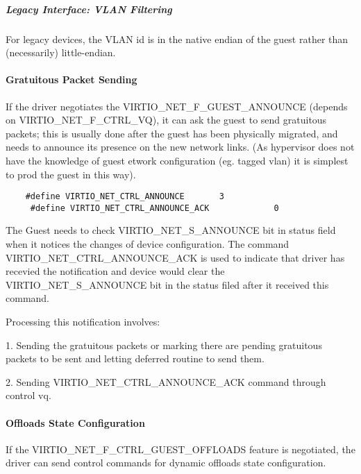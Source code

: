 \subparagraph{Legacy Interface: VLAN Filtering}\label{sec:Device Types / Network Device / Device Operation / Control Virtqueue / VLAN Filtering / Legacy Interface: VLAN Filtering}
For legacy devices, the VLAN id is in the
native endian of the guest rather than (necessarily) little-endian.

\paragraph{Gratuitous Packet Sending}\label{sec:Device Types / Network Device / Device Operation / Control Virtqueue / Gratuitous Packet Sending}

If the driver negotiates the VIRTIO_NET_F_GUEST_ANNOUNCE (depends
on VIRTIO_NET_F_CTRL_VQ), it can ask the guest to send gratuitous
packets; this is usually done after the guest has been physically
migrated, and needs to announce its presence on the new network
links. (As hypervisor does not have the knowledge of guest
etwork configuration (eg. tagged vlan) it is simplest to prod
the guest in this way).

\begin{lstlisting}
	#define VIRTIO_NET_CTRL_ANNOUNCE       3
	 #define VIRTIO_NET_CTRL_ANNOUNCE_ACK             0
\end{lstlisting}

The Guest needs to check VIRTIO_NET_S_ANNOUNCE bit in status
field when it notices the changes of device configuration. The
command VIRTIO_NET_CTRL_ANNOUNCE_ACK is used to indicate that
driver has recevied the notification and device would clear the
VIRTIO_NET_S_ANNOUNCE bit in the status filed after it received
this command.

Processing this notification involves:

1. Sending the gratuitous packets or marking there are pending
  gratuitous packets to be sent and letting deferred routine to
  send them.

2. Sending VIRTIO_NET_CTRL_ANNOUNCE_ACK command through control
  vq.

\paragraph{Offloads State Configuration}\label{sec:Device Types / Network Device / Device Operation / Control Virtqueue / Offloads State Configuration}

If the VIRTIO_NET_F_CTRL_GUEST_OFFLOADS feature is negotiated, the driver can
send control commands for dynamic offloads state configuration.

